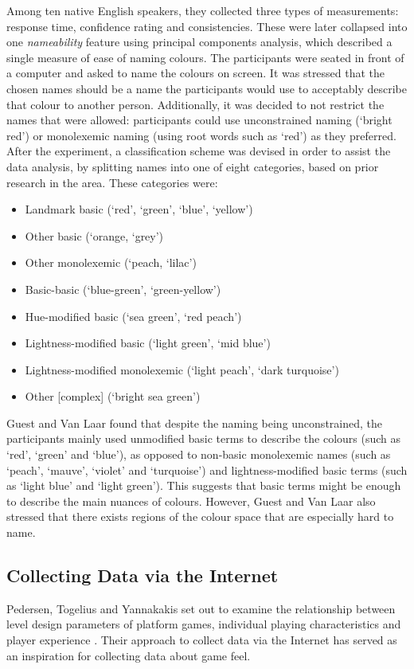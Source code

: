 Among ten native English speakers, they collected three types of measurements: response time, confidence rating and consistencies. These were later collapsed into one \textit{nameability} feature using principal components analysis, which described a single measure of ease of naming colours. The participants were seated in front of a computer and asked to name the colours on screen. It was stressed that the chosen names should be a name the participants would use to acceptably describe that colour to another person. Additionally, it was decided to not restrict the names that were allowed: participants could use unconstrained naming (`bright red') or monolexemic naming (using root words such as `red') as they preferred. After the experiment, a classification scheme was devised in order to assist the data analysis, by splitting names into one of eight categories, based on prior research in the area. These categories were:
\begin{itemize}[noitemsep,nolistsep]
\item Landmark basic (`red', `green', `blue', `yellow')
\item Other basic (`orange, `grey')
\item Other monolexemic (`peach, `lilac')
\item Basic-basic (`blue-green', `green-yellow')
\item Hue-modified basic (`sea green', `red peach')
\item Lightness-modified basic (`light green', `mid blue')
\item Lightness-modified monolexemic (`light peach', `dark turquoise')
\item Other [complex] (`bright sea green')
\end{itemize}
Guest and Van Laar found that despite the naming being unconstrained, the participants mainly used unmodified basic terms to describe the colours (such as `red', `green' and `blue'), as opposed to non-basic monolexemic names (such as `peach', `mauve', `violet' and `turquoise') and lightness-modified basic terms (such as `light blue' and `light green'). This suggests that basic terms might be enough to describe the main nuances of colours. However, Guest and Van Laar also stressed that there exists regions of the colour space that are especially hard to name.

\subsection{Collecting Data via the Internet} \label{marioLevel}
Pedersen, Togelius and Yannakakis set out to examine the relationship between level design parameters of platform games, individual playing characteristics and player experience \cite{marioModel}. Their approach to collect data via the Internet has served as an inspiration for collecting data about game feel.

